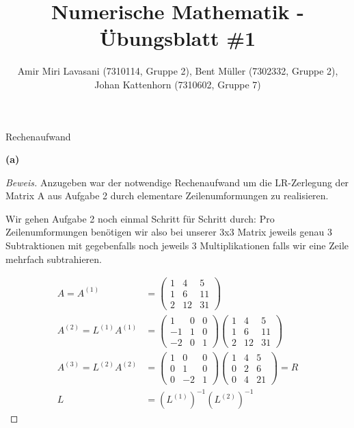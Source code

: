 \documentclass[10pt]{article}
\newenvironment{Aufgabe}[2][Aufgabe]{\begin{trivlist}
\item[\hskip \labelsep {\bfseries #1}\hskip \labelsep {\bfseries #2.}]}{\end{trivlist}}
\begin{document}
 
\title{ \textbf{Numerische Mathematik - Übungsblatt \#1} }

\author{Amir Miri Lavasani (7310114, Gruppe 2), Bent Müller (7302332, Gruppe 2), \\ 
Johan Kattenhorn (7310602, Gruppe 7)} \maketitle
 
\begin{Aufgabe}{3}
	Rechenaufwand
\end{Aufgabe}

\textbf{(a)}

\begin{proof}[Beweis]
	Anzugeben war der notwendige Rechenaufwand um die LR-Zerlegung der Matrix A 
	aus Aufgabe 2 durch elementare Zeilenumformungen zu realisieren.

	Wir gehen Aufgabe 2 noch einmal Schritt für Schritt durch:
	Pro Zeilenumformungen benötigen wir also bei unserer 3x3 Matrix
	jeweils genau 3 Subtraktionen mit gegebenfalls noch jeweils
	3 Multiplikationen falls wir eine Zeile mehrfach subtrahieren.

	\begin{align}
		A = A^{(1)} &=
		\begin{pmatrix}
			1 & 4 & 5 \\
			1 & 6 & 11 \\
			2 & 12 & 31
		\end{pmatrix} \\
		A^{(2)} = L^{(1)} A^{(1)} &= 
		\begin{pmatrix}
			1 & 0 & 0 \\
			-1 & 1 & 0 \\
			-2 & 0 & 1 
		\end{pmatrix}
		\begin{pmatrix}
			1 & 4 & 5 \\
			1 & 6 & 11 \\
			2 & 12 & 31
		\end{pmatrix} \\
		A^{(3)} = L^{(2)} A^{(2)} &=
		\begin{pmatrix}
			1 & 0 & 0 \\
			0 & 1 & 0 \\
			0 & -2 & 1
		\end{pmatrix}
		\begin{pmatrix}
			1 & 4 & 5 \\
			0 & 2 & 6 \\
			0 & 4 & 21
		\end{pmatrix} 
		= R \\
		L &= (L^{(1)})^{-1} (L^{(2)})^{-1}
	\end{align}


\end{proof}
\end{document}
